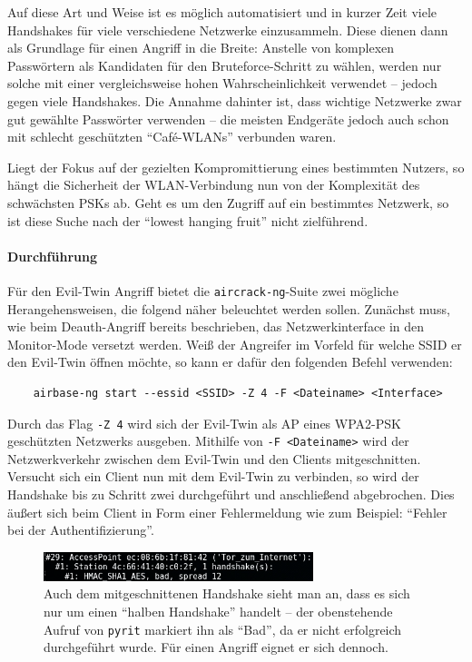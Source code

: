 Auf diese Art und Weise ist es möglich automatisiert und in kurzer Zeit viele Handshakes für viele verschiedene Netzwerke einzusammeln. Diese dienen dann als Grundlage für einen Angriff in die Breite: Anstelle von komplexen Passwörtern als Kandidaten  für den Bruteforce-Schritt zu wählen, werden nur solche mit einer vergleichsweise hohen Wahrscheinlichkeit verwendet -- jedoch gegen viele Handshakes. Die Annahme dahinter ist, dass wichtige Netzwerke zwar gut gewählte Passwörter verwenden -- die meisten Endgeräte jedoch auch schon mit schlecht geschützten \enquote{Café-WLANs} verbunden waren.

Liegt der Fokus auf der gezielten Kompromittierung eines bestimmten Nutzers, so hängt die Sicherheit der WLAN-Verbindung nun von der Komplexität des schwächsten PSKs ab. Geht es um den Zugriff auf ein bestimmtes Netzwerk, so ist diese Suche nach der \enquote{lowest hanging fruit} nicht zielführend.

\paragraph{Durchführung}
Für den Evil-Twin Angriff bietet die \texttt{aircrack-ng}-Suite zwei mögliche Herangehensweisen, die folgend näher beleuchtet werden sollen.
Zunächst muss, wie beim Deauth-Angriff bereits beschrieben, das Netzwerkinterface in den Monitor-Mode versetzt werden.
Weiß der Angreifer im Vorfeld für welche SSID er den Evil-Twin öffnen möchte, so kann er dafür den folgenden Befehl verwenden:
\begin{Verbatim}
	airbase-ng start --essid <SSID> -Z 4 -F <Dateiname> <Interface>
\end{Verbatim}

Durch das Flag \texttt{-Z 4} wird sich der Evil-Twin als AP eines WPA2-PSK geschützten Netzwerks ausgeben.
Mithilfe von \texttt{-F <Dateiname>} wird der Netzwerkverkehr zwischen dem Evil-Twin und den Clients mitgeschnitten.
Versucht sich ein Client nun mit dem Evil-Twin zu verbinden, so wird der Handshake bis zu Schritt zwei durchgeführt und anschließend abgebrochen.
Dies äußert sich beim Client in Form einer Fehlermeldung wie zum Beispiel: \enquote{Fehler bei der Authentifizierung}. \\

\begin{figure}[ht]
	\centering
	\includegraphics[width=0.7\textwidth]{graphics/pyrit_analyze}
	\caption[Pyrit]{Auch dem mitgeschnittenen Handshake sieht man an, dass es sich nur um einen \enquote{halben Handshake} handelt -- der obenstehende Aufruf von \texttt{pyrit} markiert ihn als \enquote{Bad}, da er nicht erfolgreich durchgeführt wurde. Für einen Angriff eignet er sich dennoch.}
\end{figure}
\FloatBarrier

